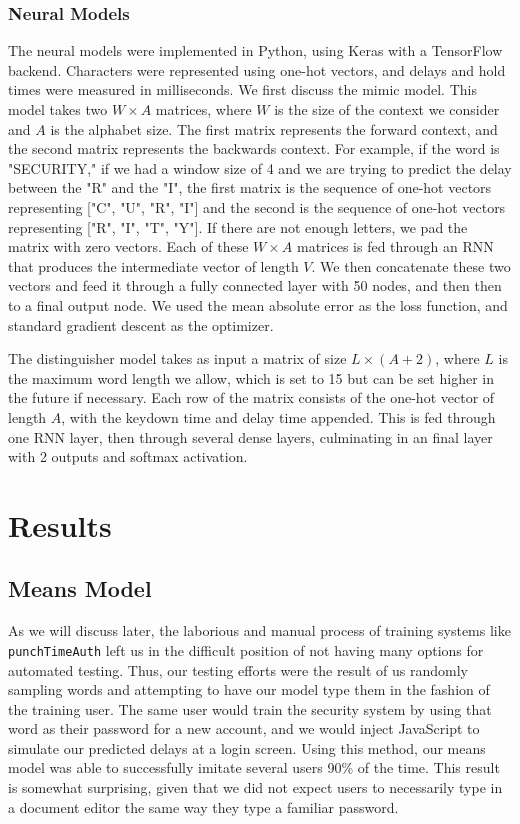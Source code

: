 \documentclass[9pt,journal]{IEEEtran}
\begin{document}
\subsubsection{Neural Models}
The neural models were implemented in Python, using Keras with a TensorFlow backend. Characters were represented using one-hot vectors, and delays and hold times were measured in milliseconds. We first discuss the mimic model. This model takes two $W \times A$ matrices, where $W$ is the size of the context we consider and $A$ is the alphabet size. The first matrix represents the forward context, and the second matrix represents the backwards context. For example, if the word is "SECURITY," if we had a window size of 4 and we are trying to predict the delay between the "R" and the "I", the first matrix is the sequence of one-hot vectors representing ["C", "U", "R", "I"] and the second is the sequence of one-hot vectors representing ["R", "I", "T", "Y"]. If there are not enough letters, we pad the matrix with zero vectors. Each of these $W \times A$ matrices is fed through an RNN that produces the intermediate vector of length $V$. We then concatenate these two vectors and feed it through a fully connected layer with 50 nodes, and then then to a final output node. We used the mean absolute error as the loss function, and standard gradient descent as the optimizer.

The distinguisher model takes as input a matrix of size $L \times (A + 2)$, where $L$ is the maximum word length we allow, which is set to 15 but can be set higher in the future if necessary. Each row of the matrix consists of the one-hot vector of length $A$, with the keydown time and delay time appended. This is fed through one RNN layer, then through several dense layers, culminating in an final layer with 2 outputs and softmax activation.

\section{Results}
\subsection{Means Model}

As we will discuss later, the laborious and manual process of training systems like \texttt{punchTimeAuth} left us in the difficult position of not having many options for automated testing. Thus, our testing efforts were the result of us randomly sampling words and attempting to have our model type them in the fashion of the training user. The same user would train the security system by using that word as their password for a new account, and we would inject JavaScript to simulate our predicted delays at a login screen. Using this method, our means model was able to successfully imitate several users 90\% of the time. This result is somewhat surprising, given that we did not expect users to necessarily type in a document editor the same way they type a familiar password.
\end{document}
